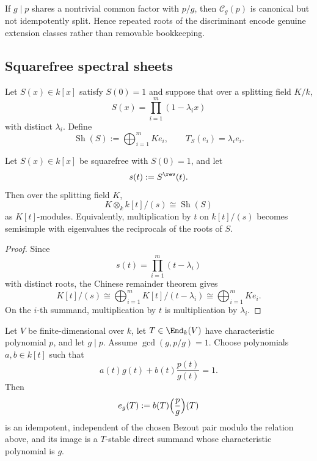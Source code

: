 \begin{corollary}
\ClaimStatusProvedHere
If \(g\mid p\) shares a nontrivial common factor with \(p/g\), then \(\mathcal C_g(p)\) is canonical but not idempotently split.
Hence repeated roots of the discriminant encode genuine extension classes rather than removable bookkeeping.
\end{corollary}

\subsection{Squarefree spectral sheets}

\begin{definition}
Let \(S(x)\in k[x]\) satisfy \(S(0)=1\) and suppose that over a splitting field \(K/k\),
\[
S(x)=\prod_{i=1}^m (1-\lambda_i x)
\]
with distinct \(\lambda_i\).
Define
\[
\operatorname{Sh}(S):=\bigoplus_{i=1}^m K e_i,
\qquad
T_S(e_i)=\lambda_i e_i.
\]
\end{definition}

\begin{theorem}
\ClaimStatusProvedHere
\label{thm:squarefree-sheet}
Let \(S(x)\in k[x]\) be squarefree with \(S(0)=1\), and let
\[
s(t):=S^{\rev}(t).
\]
Then over the splitting field \(K\),
\[
K\otimes_k k[t]/(s)\cong \operatorname{Sh}(S)
\]
as \(K[t]\)-modules.
Equivalently, multiplication by \(t\) on \(k[t]/(s)\) becomes semisimple with eigenvalues the reciprocals of the roots of \(S\).
\end{theorem}

\begin{proof}
Since
\[
s(t)=\prod_{i=1}^m (t-\lambda_i)
\]
with distinct roots, the Chinese remainder theorem gives
\[
K[t]/(s)\cong \bigoplus_{i=1}^m K[t]/(t-\lambda_i)\cong \bigoplus_{i=1}^m K e_i.
\]
On the \(i\)-th summand, multiplication by \(t\) is multiplication by \(\lambda_i\).
\end{proof}

\begin{proposition}
\ClaimStatusProvedHere
\label{prop:coprime-functional-calculus}
Let \(V\) be finite-dimensional over \(k\), let \(T\in \End_k(V)\) have characteristic polynomial \(p\), and let \(g\mid p\).
Assume \(\gcd(g,p/g)=1\).
Choose polynomials \(a,b\in k[t]\) such that
\[
a(t)g(t)+b(t)\frac{p(t)}{g(t)}=1.
\]
Then
\[
e_g(T):=b(T)\Bigl(\frac{p}{g}\Bigr)(T)
\]
is an idempotent, independent of the chosen Bezout pair modulo the relation above, and its image is a \(T\)-stable direct summand whose characteristic polynomial is \(g\).
\end{proposition}


